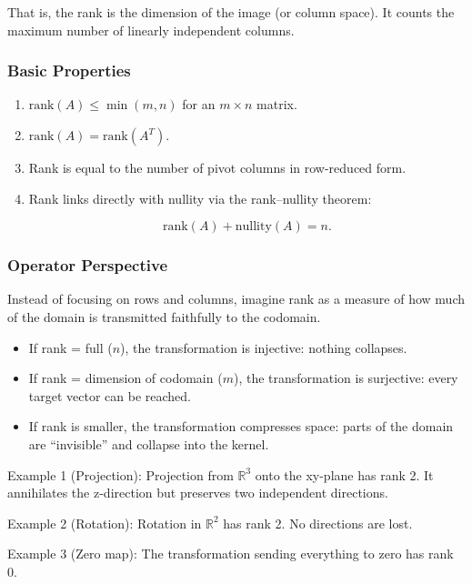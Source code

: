 \documentclass[
  letterpaper,
  DIV=11,
  numbers=noendperiod]{scrreprt}
\providecommand{\tightlist}{%
  \setlength{\itemsep}{0pt}\setlength{\parskip}{0pt}}
\begin{document}
That is, the rank is the dimension of the image (or column space). It
counts the maximum number of linearly independent columns.

\subsubsection{Basic Properties}\label{basic-properties}

\begin{enumerate}
\def\labelenumi{\arabic{enumi}.}
\item
  \(\text{rank}(A) \leq \min(m,n)\) for an \(m \times n\) matrix.
\item
  \(\text{rank}(A) = \text{rank}(A^T)\).
\item
  Rank is equal to the number of pivot columns in row-reduced form.
\item
  Rank links directly with nullity via the rank--nullity theorem:

  \[
  \text{rank}(A) + \text{nullity}(A) = n.
  \]
\end{enumerate}

\subsubsection{Operator Perspective}\label{operator-perspective}

Instead of focusing on rows and columns, imagine rank as a measure of
how much of the domain is transmitted faithfully to the codomain.

\begin{itemize}
\tightlist
\item
  If rank = full (\(n\)), the transformation is injective: nothing
  collapses.
\item
  If rank = dimension of codomain (\(m\)), the transformation is
  surjective: every target vector can be reached.
\item
  If rank is smaller, the transformation compresses space: parts of the
  domain are ``invisible'' and collapse into the kernel.
\end{itemize}

Example 1 (Projection): Projection from \(\mathbb{R}^3\) onto the
xy-plane has rank 2. It annihilates the z-direction but preserves two
independent directions.

Example 2 (Rotation): Rotation in \(\mathbb{R}^2\) has rank 2. No
directions are lost.

Example 3 (Zero map): The transformation sending everything to zero has
rank 0.
\end{document}
